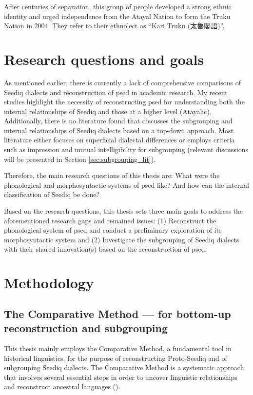 After centuries of separation, this group of people developed a strong ethnic identity and urged independence from the Atayal Nation to form the Truku Nation in 2004. They refer to their ethnolect as ``Kari Truku (太魯閣語)''.

\section{Research questions and goals}

As mentioned earlier, there is currently a lack of comprehensive comparisons of Seediq dialects and reconstruction of \acl{psed} in academic research. My recent studies highlight the necessity of reconstructing \acl{psed} for understanding both the internal relationships of Seediq and those at a higher level (Atayalic). Additionally, there is no literature found that discusses the subgrouping and internal relationships of Seediq dialects based on a top-down approach. Most literature either focuses on superficial dialectal differences or employs criteria such as impression and mutual intelligibility for subgrouping (relevant discussions will be presented in Section \ref{sec:subgrouping_lit}). 

Therefore, the main research questions of this thesis are: What were the phonological and morphosyntactic systems of \acl{psed} like? And how can the internal classification of Seediq be done?

Based on the research questions, this thesis sets three main goals to address the aforementioned research gaps and remained issues: (1) Reconstruct the phonological system of \acl{psed} and conduct a preliminary exploration of its morphosyntactic system and (2) Investigate the subgrouping of Seediq dialects with their shared innovation(s) based on the reconstruction of \acl{psed}.


\section{Methodology}\label{sec:methodology}

\subsection{The Comparative Method --- for bottom-up reconstruction and subgrouping}

This thesis mainly employs the Comparative Method, a fundamental tool in historical linguistics, for the purpose of reconstructing Proto-Seediq and of subgrouping Seediq dialects. The Comparative Method is a systematic approach that involves several essential steps in order to uncover linguistic relationships and reconstruct ancestral languages (\cite{fox1995linguistic}).

